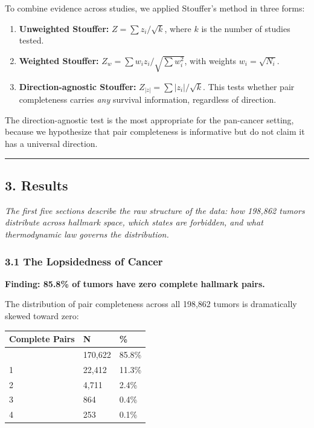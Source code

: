 \documentclass[
  11pt,
]{article}
\newcounter{none} %
\providecommand{\tightlist}{%
  \setlength{\itemsep}{0pt}\setlength{\parskip}{0pt}}
\begin{document}
To combine evidence across studies, we applied Stouffer's method in
three forms:

\begin{enumerate}
\def\labelenumi{\arabic{enumi}.}
\tightlist
\item
  \textbf{Unweighted Stouffer:} \(Z = \sum z_i / \sqrt{k}\), where \(k\)
  is the number of studies tested.
\item
  \textbf{Weighted Stouffer:}
  \(Z_w = \sum w_i z_i / \sqrt{\sum w_i^2}\), with weights
  \(w_i = \sqrt{N_i}\).
\item
  \textbf{Direction-agnostic Stouffer:}
  \(Z_{|z|} = \sum |z_i| / \sqrt{k}\). This tests whether pair
  completeness carries \emph{any} survival information, regardless of
  direction.
\end{enumerate}

The direction-agnostic test is the most appropriate for the pan-cancer
setting, because we hypothesize that pair completeness is informative
but do not claim it has a universal direction.

\begin{center}\rule{0.5\linewidth}{0.5pt}\end{center}

\subsection{3. Results}\label{results}

\emph{The first five sections describe the raw structure of the data:
how 198,862 tumors distribute across hallmark space, which states are
forbidden, and what thermodynamic law governs the distribution.}

\subsubsection{3.1 The Lopsidedness of
Cancer}\label{the-lopsidedness-of-cancer}

\textbf{Finding: 85.8\% of tumors have zero complete hallmark pairs.}

The distribution of pair completeness across all 198,862 tumors is
dramatically skewed toward zero:

{\def\LTcaptype{none} %
\begin{longtable}[]{@{}lll@{}}
\toprule\noalign{}
Complete Pairs & N & \% \\
\midrule\noalign{}
\endhead
\bottomrule\noalign{}
\endlastfoot
0 & 170,622 & 85.8\% \\
1 & 22,412 & 11.3\% \\
2 & 4,711 & 2.4\% \\
3 & 864 & 0.4\% \\
4 & 253 & 0.1\% \\
\end{longtable}
}
\end{document}
